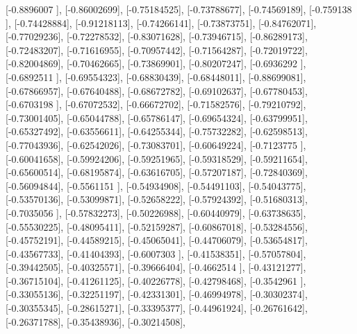 \documentclass{article}
\begin{document}
       [-0.8896007 ],
       [-0.86002699],
       [-0.75184525],
       [-0.73788677],
       [-0.74569189],
       [-0.759138  ],
       [-0.74428884],
       [-0.91218113],
       [-0.74266141],
       [-0.73873751],
       [-0.84762071],
       [-0.77029236],
       [-0.72278532],
       [-0.83071628],
       [-0.73946715],
       [-0.86289173],
       [-0.72483207],
       [-0.71616955],
       [-0.70957442],
       [-0.71564287],
       [-0.72019722],
       [-0.82004869],
       [-0.70462665],
       [-0.73869901],
       [-0.80207247],
       [-0.6936292 ],
       [-0.6892511 ],
       [-0.69554323],
       [-0.68830439],
       [-0.68448011],
       [-0.88699081],
       [-0.67866957],
       [-0.67640488],
       [-0.68672782],
       [-0.69102637],
       [-0.67780453],
       [-0.6703198 ],
       [-0.67072532],
       [-0.66672702],
       [-0.71582576],
       [-0.79210792],
       [-0.73001405],
       [-0.65044788],
       [-0.65786147],
       [-0.69654324],
       [-0.63799951],
       [-0.65327492],
       [-0.63556611],
       [-0.64255344],
       [-0.75732282],
       [-0.62598513],
       [-0.77043936],
       [-0.62542026],
       [-0.73083701],
       [-0.60649224],
       [-0.7123775 ],
       [-0.60041658],
       [-0.59924206],
       [-0.59251965],
       [-0.59318529],
       [-0.59211654],
       [-0.65600514],
       [-0.68195874],
       [-0.63616705],
       [-0.57207187],
       [-0.72840369],
       [-0.56094844],
       [-0.5561151 ],
       [-0.54934908],
       [-0.54491103],
       [-0.54043775],
       [-0.53570136],
       [-0.53099871],
       [-0.52658222],
       [-0.57924392],
       [-0.51680313],
       [-0.7035056 ],
       [-0.57832273],
       [-0.50226988],
       [-0.60440979],
       [-0.63738635],
       [-0.55530225],
       [-0.48095411],
       [-0.52159287],
       [-0.60867018],
       [-0.53284556],
       [-0.45752191],
       [-0.44589215],
       [-0.45065041],
       [-0.44706079],
       [-0.53654817],
       [-0.43567733],
       [-0.41404393],
       [-0.6007303 ],
       [-0.41538351],
       [-0.57057804],
       [-0.39442505],
       [-0.40325571],
       [-0.39666404],
       [-0.4662514 ],
       [-0.43121277],
       [-0.36715104],
       [-0.41261125],
       [-0.40226778],
       [-0.42798468],
       [-0.3542961 ],
       [-0.33055136],
       [-0.32251197],
       [-0.42331301],
       [-0.46994978],
       [-0.30302374],
       [-0.30355345],
       [-0.28615271],
       [-0.33395377],
       [-0.44961924],
       [-0.26761642],
       [-0.26371788],
       [-0.35438936],
       [-0.30214508],
\end{document}
